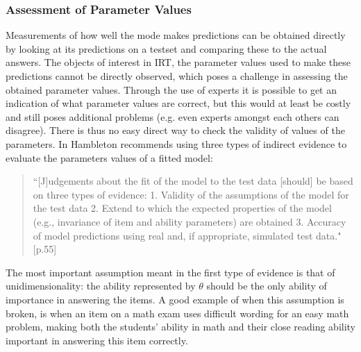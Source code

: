 \documentclass{scrartcl}
\begin{document}


\subsubsection{Assessment of Parameter Values}
\label{sec:asses}
Measurements of how well the mode makes predictions can be obtained directly by looking at its predictions on a testset and comparing these to the actual answers. The objects of interest in IRT, the parameter values used to make these predictions cannot be directly observed, which poses a challenge in assessing the obtained parameter values. Through the use of experts it is possible to get an indication of what parameter values are correct, but this would at least be costly and still poses additional problems (e.g. even experts amongst each others can disagree). There is thus no easy direct way to check the validity of values of the parameters. In \cite{hambleton} Hambleton recommends using three types of indirect evidence to evaluate the parameters values of a fitted model:

\begin{quote}``[J]udgements about the fit of the model to the test data [should] be based on three types of evidence: 1. Validity of the assumptions of the model for the test data 2. Extend to which the expected properties of the model (e.g., invariance of item and ability parameters) are obtained 3. Accuracy of model predictions using real and, if appropriate, simulated test data."[p.55]
\end{quote}

The most important assumption meant in the first type of evidence is that of unidimensionality: the ability represented by $\theta$ should be the only ability of importance in answering the items. A good example of when this assumption is broken, is when an item on a math exam uses difficult wording for an easy math problem, making both the students' ability in math and their close reading ability important in answering this item correctly.  
\end{document}
